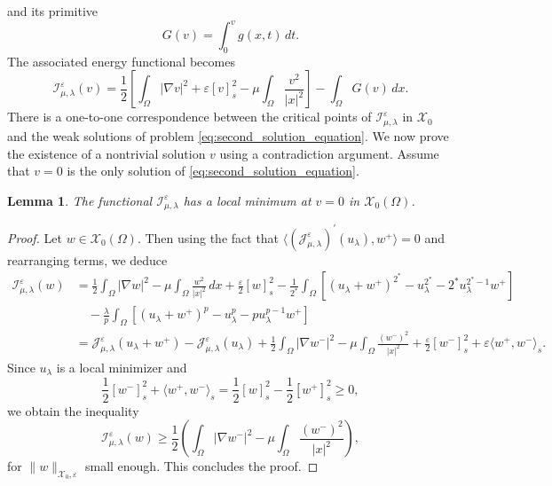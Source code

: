 \documentclass[11pt]{article}
\newtheorem{lemma}{Lemma}[section] %
\newcommand{\om} {\Omega}
\newcommand{\X}{\mathcal{X}_0} %
\newcommand{\Je}{\mathcal{J}_{\mu,\lambda}^{\varepsilon}} %
\newcommand{\Ie}{\mathcal{I}_{\mu,\lambda}^{\varepsilon}} %
\begin{document}
and its primitive
\begin{equation*}
G(v) = \int_0^v g(x,t) \, dt.
\end{equation*}
The associated energy functional becomes
\begin{equation*}
\Ie(v) = \frac{1}{2} \left[ \int_{\Omega} |\nabla v|^2 + \varepsilon  [v]_{s}^2 - \mu \int_{\Omega} \frac{v^2}{|x|^2} \right] - \int_{\Omega} G(v) \, dx.
\end{equation*}
There is a one-to-one correspondence between the critical points of $\Ie$ in $\X$ and the weak solutions of problem \eqref{eq:second_solution_equation}.
We now prove the existence of a nontrivial solution \( v \) using a contradiction argument. Assume that \( v = 0 \) is the only solution of \eqref{eq:second_solution_equation}.

\begin{lemma}
The functional \( \Ie \) has a local minimum at $v =0$ in \( \X(\om) \).
\end{lemma}
\begin{proof}
Let \( w \in \X (\om)\). Then using the fact that \( \langle (\Je)^{\prime}(u_{\lambda}), w^+ \rangle = 0 \) and rearranging terms, we deduce
\begin{equation*}
\begin{aligned}
\Ie(w) &= \frac{1}{2} \int_{\Omega} |\nabla w|^2 - \mu \int_{\Omega} \frac{w^2}{|x|^2} \, dx + \frac{\varepsilon }{2} [w]^2_s - \frac{1}{2^*} \int_{\Omega} \left[ (u_{\lambda} + w^+)^{2^*} - u_{\lambda}^{2^*} - 2^* u_{\lambda}^{2^* - 1} w^+ \right] \\
&\quad - \frac{\lambda}{ p} \int_{\Omega} \left[ (u_{\lambda} + w^+)^{p} - u_{\lambda}^{p} - p u_{\lambda}^{p-1} w^+ \right] \\
&  = \Je(u_{\lambda} + w^+) - \Je(u_{\lambda})  + \frac{1}{2} \int_{\Omega} |\nabla w^-|^2 - \mu \int_{\Omega} \frac{(w^-)^2}{|x|^2} + \frac{\varepsilon }{2} [w^-]_s^2 + \varepsilon  \langle w^+, w^- \rangle_s.
\end{aligned}
\end{equation*}
Since \( u_{\lambda} \) is a local minimizer and
\begin{equation*}
\frac{1}{2} [w^-]_s^2 + \langle w^+, w^- \rangle_s = \frac{1}{2} [w]_s^2 - \frac{1}{2} [w^+]_s^2 \geq 0,
\end{equation*}
we obtain the inequality
\begin{equation*}
\Ie(w) \geq \frac{1}{2} \left( \int_{\Omega} |\nabla w^-|^2 - \mu \int_{\Omega} \frac{(w^-)^2}{|x|^2} \right),
\end{equation*}
for \( \|w\|_{\X, \varepsilon} \) small enough. This concludes the proof.
\end{proof}
\end{document}
